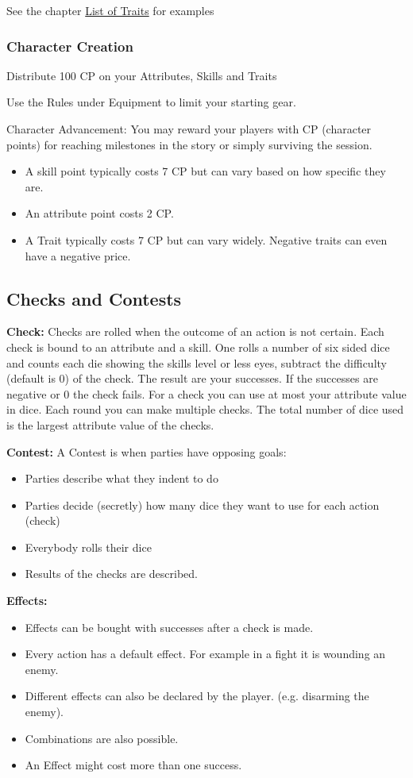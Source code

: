 \documentclass[11pt]{article}
\begin{document}
{\begin{multicols}{2}[]
See the chapter \hyperref[sec:orgc37752b]{List of Traits} for examples

\subsubsection{Character Creation}
\label{sec:orgc9ff43e}
Distribute 100 CP on your Attributes, Skills and Traits

Use the Rules under Equipment to limit your starting gear.

Character Advancement:
You may reward your players with CP (character points) for reaching milestones in the story or simply surviving the session.

\begin{itemize}
\item A skill point typically costs 7 CP but can vary based on how specific they are.
\item An attribute point costs 2 CP.
\item A Trait typically costs 7 CP but can vary widely. Negative traits can even have a negative price.
\end{itemize}

\subsection{Checks and Contests}
\label{sec:org552c9d6}
\textbf{Check:}
Checks are rolled when the outcome of an action is not certain. Each check is bound to an attribute and a skill. One rolls a number of six sided dice and counts each die showing the skills level or less eyes, subtract the difficulty (default is 0) of the check. The result are your successes. If the successes are negative or 0 the check fails. For a check you can use at most your attribute value in dice.
Each round you can make multiple checks. The total number of dice used is the largest attribute value of the checks. 

\textbf{Contest:}
A Contest is when parties have opposing goals:
\begin{itemize}
\item Parties describe what they indent to do
\item Parties decide (secretly) how many dice they want to use for each action (check)
\item Everybody rolls their dice
\item Results of the checks are described.
\end{itemize}

\textbf{Effects:}
\begin{itemize}
\item Effects can be bought with successes after a check is made.
\item Every action has a default effect. For example in a fight it is wounding an enemy.
\item Different effects can also be declared by the player. (e.g. disarming the enemy).
\item Combinations are also possible.
\item An Effect might cost more than one success.
\end{itemize}


\end{multicols}}
\end{document}
